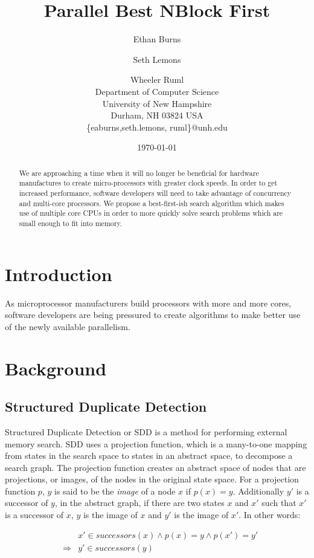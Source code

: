 \documentclass{article} \usepackage{aaai} \usepackage{graphicx}
\title{Parallel Best NBlock First}
\author{Ethan Burns \and Seth Lemons \and Wheeler Ruml \\
Department of Computer Science \\
University of New Hampshire \\
Durham, NH 03824 USA \\
\{eaburns,seth.lemons, ruml\}@unh.edu}
\date{\today}
\begin{document}
\maketitle

\begin{abstract}
We are approaching a time when it will no longer be beneficial for
hardware manufactures to create micro-processors with greater clock
speeds.  In order to get increased performance, software developers
will need to take advantage of concurrency and multi-core processors.
We propose a best-first-ish search algorithm which makes use of
multiple core CPUs in order to more quickly solve search problems
which are small enough to fit into memory.
\end{abstract}

\section{Introduction}

As microprocessor manufacturers build processors with more and more
cores, software developers are being pressured to create algorithms to
make better use of the newly available parallelism.

\section{Background}

\subsection{Structured Duplicate Detection}

Structured Duplicate Detection or SDD \cite{zhou:sdd} is a method for
performing external memory search.  SDD uses a projection function,
which is a many-to-one mapping from states in the search space to
states in an abstract space, to decompose a search graph.  The
projection function creates an abstract space of nodes that are
projections, or images, of the nodes in the original state space.  For
a projection function $p$, $y$ is said to be the \emph{image} of a
node $x$ if $p(x) = y$.  Additionally $y'$ is a successor of $y$, in
the abstract graph, if there are two states $x$ and $x'$ such that
$x'$ is a successor of $x$, $y$ is the image of $x$ and $y'$ is the
image of $x'$.  In other words:

\begin{eqnarray*}
&&x' \in successors(x) \wedge p(x) = y \wedge p(x') = y' \\
&\Rightarrow& y' \in successors(y)
\end{eqnarray*}
\end{document}
